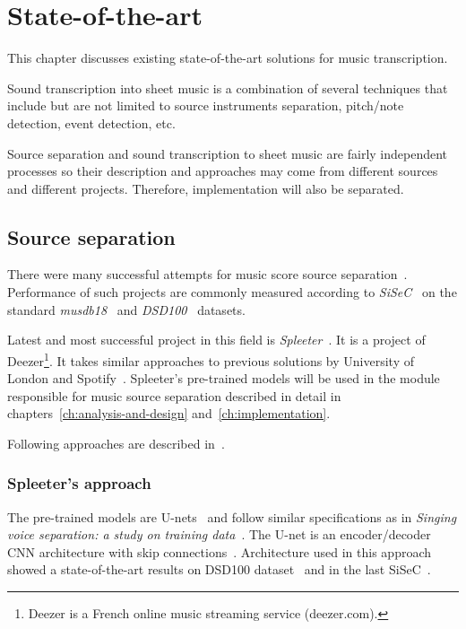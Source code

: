 \chapter{State-of-the-art}\label{ch:state-of-the-art}

This chapter discusses existing state-of-the-art solutions for music transcription.

Sound transcription into sheet music is a combination of several techniques that include but are not limited to source
instruments separation, pitch/note detection, event detection, etc.

Source separation and sound transcription to sheet music are fairly independent processes so their description and
approaches may come from different sources and different projects. Therefore, implementation will also be separated.

\section{Source separation}\label{sec:source-separation}

There were many successful attempts for music score source separation~\cite{spleeter2019,singing-voice-separation,singing-voice-separation-article}.
Performance of such projects are commonly measured according to \textit{\ac{SiSeC}}~\cite{stter20182018}
on the standard \textit{musdb18}~\cite{musdb18} and \textit{DSD100}~\cite{SiSEC16} datasets.

Latest and most successful project in this field is \textit{Spleeter}~\cite{spleeter2019}. It is a project of
Deezer\footnote{Deezer is a French online music streaming service (deezer.com).}. It takes similar approaches to previous solutions
by University of London and Spotify~\cite{singing-voice-separation}. Spleeter's pre-trained models will be used in the
module responsible for music source separation described in detail in chapters~\ref{ch:analysis-and-design} and~\ref{ch:implementation}.

Following approaches are described in~\cite{spleeter2019,singing-voice-separation,singing-voice-separation-article}.

\subsection{Spleeter's approach}\label{subsec:music-source-separation:approach}
The pre-trained models are U-nets~\cite{singing-voice-separation} and follow similar specifications as in
\textit{Singing voice separation: a study on training data}~\cite{singing-voice-separation-article}. The U-net is an
encoder/decoder \ac{CNN} architecture with skip connections~\cite{spleeter2019}. Architecture used in this approach
showed a state-of-the-art results on DSD100 dataset~\cite{singing-voice-separation} and in the last \ac{SiSeC}~\cite{SiSEC16}.

